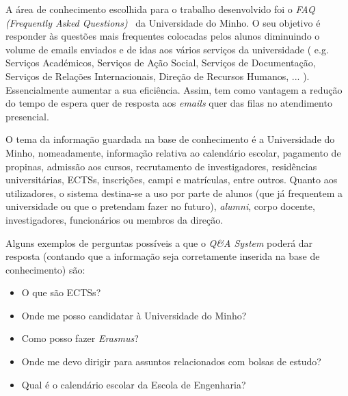 \qquad A área de conhecimento escolhida para o trabalho desenvolvido foi o \textit{FAQ (Frequently Asked Questions)}~\cite{FAQ} da Universidade do Minho. O seu objetivo é responder às questões mais frequentes colocadas pelos alunos diminuindo o volume de emails enviados e de idas aos vários serviços da universidade ( e.g. Serviços Académicos, Serviços de Ação Social, Serviços de Documentação, Serviços de Relações Internacionais, Direção de Recursos Humanos, ... ). Essencialmente aumentar a sua eficiência. Assim, tem como vantagem a redução do tempo de espera quer de resposta aos \textit{emails} quer das filas no atendimento presencial.

 O tema da informação guardada na base de conhecimento é a Universidade do Minho, nomeadamente, informação relativa ao calendário escolar, pagamento de propinas, admissão aos cursos, recrutamento de investigadores, residências universitárias, ECTSs, inscrições, campi e matrículas, entre outros. Quanto aos utilizadores, o sistema destina-se a uso por parte de alunos (que já frequentem a universidade ou que o pretendam fazer no futuro), \textit{alumni}, corpo docente, investigadores, funcionários ou membros da direção.

Alguns exemplos de perguntas possíveis a que o \textit{Q\&A System} poderá dar resposta (contando que a informação seja corretamente inserida na base de conhecimento) são:
\begin{itemize}
    \item O que são ECTSs?
    \item Onde me posso candidatar à Universidade do Minho?
    \item Como posso fazer \textit{Erasmus}?
    \item Onde me devo dirigir para assuntos relacionados com bolsas de estudo?
    \item Qual é o calendário escolar da Escola de Engenharia?
\end{itemize}